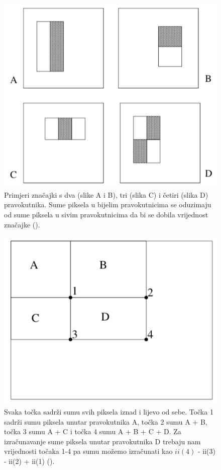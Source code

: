 \begin{figure}
	\centering
	\includegraphics[scale=1]{img/viola-jones-znacajke.png}
	\caption{Primjeri značajki s dva (slike A i B), tri (slika C) i četiri (slika D) pravokutnika. Sume piksela u bijelim pravokutnicima se oduzimaju od sume piksela u sivim pravokutnicima da bi se dobila vrijednost značajke (\cite{Viola01rapidobject}).}
	\label{viola-jones-znacajke}
\end{figure}

\begin{figure}
	\centering
	\includegraphics[scale=1]{img/viola-jones-pravokutnici.png}
	\caption{Svaka točka sadrži sumu svih piksela iznad i lijevo od sebe. Točka 1 sadrži sumu piksela unutar pravokutnika A, točka 2 sumu A + B, točka 3 sumu A + C i točka 4 sumu A + B + C + D. Za izračunavanje sume piksela unutar pravokutnika D trebaju nam vrijednosti točaka 1-4 pa sumu možemo izračunati kao $ii(4)$ - ii(3) - ii(2) + ii(1) (\cite{Viola01rapidobject}).}
	\label{viola-jones-pravokutnici}
\end{figure}

